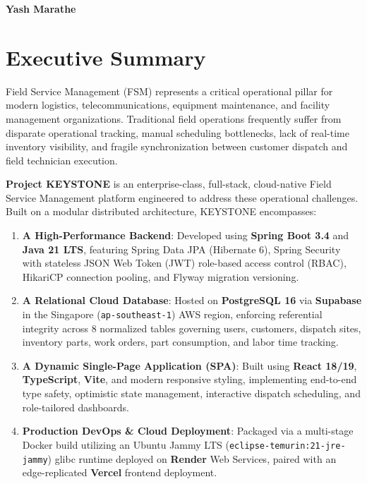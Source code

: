 \documentclass[12pt,a4paper,oneside]{report}
\begin{document}
\vspace{1.5cm}
\noindent\textbf{Yash Marathe}

\newpage
\chapter*{Executive Summary}

Field Service Management (FSM) represents a critical operational pillar for modern logistics, telecommunications, equipment maintenance, and facility management organizations. Traditional field operations frequently suffer from disparate operational tracking, manual scheduling bottlenecks, lack of real-time inventory visibility, and fragile synchronization between customer dispatch and field technician execution.

\textbf{Project KEYSTONE} is an enterprise-class, full-stack, cloud-native Field Service Management platform engineered to address these operational challenges. Built on a modular distributed architecture, KEYSTONE encompasses:
\begin{enumerate}[label=(\roman*)]
    \item \textbf{A High-Performance Backend}: Developed using \textbf{Spring Boot 3.4} and \textbf{Java 21 LTS}, featuring Spring Data JPA (Hibernate 6), Spring Security with stateless JSON Web Token (JWT) role-based access control (RBAC), HikariCP connection pooling, and Flyway migration versioning.
    \item \textbf{A Relational Cloud Database}: Hosted on \textbf{PostgreSQL 16} via \textbf{Supabase} in the Singapore (\texttt{ap-southeast-1}) AWS region, enforcing referential integrity across 8 normalized tables governing users, customers, dispatch sites, inventory parts, work orders, part consumption, and labor time tracking.
    \item \textbf{A Dynamic Single-Page Application (SPA)}: Built using \textbf{React 18/19}, \textbf{TypeScript}, \textbf{Vite}, and modern responsive styling, implementing end-to-end type safety, optimistic state management, interactive dispatch scheduling, and role-tailored dashboards.
    \item \textbf{Production DevOps \& Cloud Deployment}: Packaged via a multi-stage Docker build utilizing an Ubuntu Jammy LTS (\texttt{eclipse-temurin:21-jre-jammy}) glibc runtime deployed on \textbf{Render} Web Services, paired with an edge-replicated \textbf{Vercel} frontend deployment.
\end{enumerate}
\end{document}
